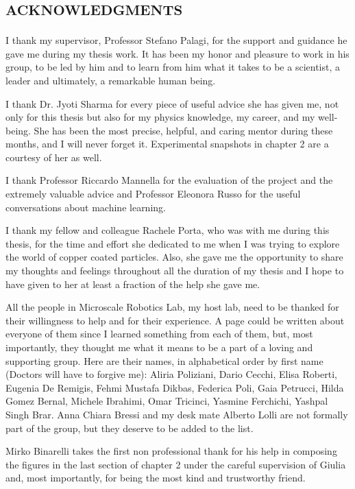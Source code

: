 	\section*{\textsc{acknowledgments}}
I thank my supervisor, Professor Stefano Palagi, for the support and guidance he gave me during my thesis work.
It has been my honor and pleasure to work in his group, to be led by him and to learn from him what it takes to be a scientist, a leader and ultimately, a remarkable human being.

I thank Dr. Jyoti Sharma for every piece of useful advice she has given me, not only for this thesis but also for my physics knowledge, my career, and my well-being.
She has been the most precise, helpful, and caring mentor during these months, and I will never forget it.
Experimental snapshots in chapter 2 are a courtesy of her as well.

I thank Professor Riccardo Mannella for the evaluation of the project and the extremely valuable advice and Professor Eleonora Russo for the useful conversations about machine learning.

I thank my fellow and colleague Rachele Porta, who was with me during this thesis, for the time and effort she dedicated to me when I was trying to explore the world of copper coated particles.
Also, she gave me the opportunity to share my thoughts and feelings throughout all the duration of my thesis and I hope to have given to her at least a fraction of the help she gave me.

All the people in Microscale Robotics Lab, my host lab, need to be thanked for their willingness to help and for their experience.
A page could be written about everyone of them since I learned something from each of them, but, most importantly, they thought me what it means to be a part of a loving and supporting group.
Here are their names, in alphabetical order by first name (Doctors will have to forgive me): Aliria Poliziani, Dario Cecchi, Elisa Roberti, Eugenia De Remigis, Fehmi Mustafa Dikbas, Federica Poli, Gaia Petrucci, Hilda Gomez Bernal, Michele Ibrahimi, Omar Tricinci, Yasmine Ferchichi, Yashpal Singh Brar.
Anna Chiara Bressi and my desk mate Alberto Lolli are not formally part of the group, but they deserve to be added to the list.

Mirko Binarelli takes the first non professional thank for his help in composing the figures in the last section of chapter 2 under the careful supervision of Giulia and, most importantly, for being the most kind and trustworthy friend.

